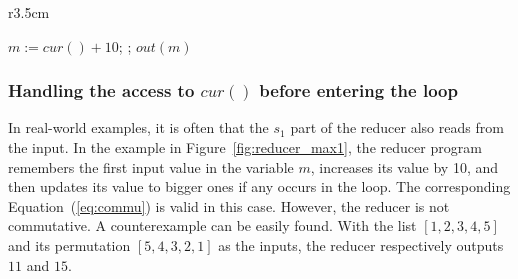 \documentclass{llncs}
\newcommand{\hide}[1]{}
\newcommand{\cur}{cur()}
\begin{document}
\begin{wrapfigure}{r}{3.5cm}
	\vspace{-1.5cm}
	\begin{algorithm}[H]
		\;\;$m := \cur + 10$; \;
		\Loop{}{
			$t:=\cur$\;
			\uIf{ $t> m$}{
				$m := t$ \;
			}
		};
		$out(m)$\;\;
	\end{algorithm}
	\vspace{-0.8cm}
	\caption{Reducer max$^+$}
	\vspace{-0.8cm}
	\label{fig:reducer_max1}
\end{wrapfigure}	


\hide{	
	\begin{figure}[t]
		\begin{minipage}{0.4\textwidth}
			\begin{algorithm}[H]
				\;\;$m := \cur + 10$; \;
				\Loop{}{
					$t:=\cur$\;
					\uIf{ $t> m$}{
						$m := t$ \;
					}
				};
				$out(m)$\;\;
			\end{algorithm}
			\caption*{(a) Reducer max$^+$}
		\end{minipage}
		\begin{minipage}{0.6\textwidth}
			\begin{algorithm}[H]
				$s:=*;$\;
				\Loop{}{
					\uIf{$s=1$}{$m := \cur + 10; s:= 2$}
					\uElse{
						$t:=\cur$\;
						\uIf{ $t > m$}{
							$m := t$ \;
						}
					}
				};
				$out(m)$
			\end{algorithm}
			\caption*{(b) Reducer max$^{+\mathtt{fix}}$}
		\end{minipage}
		\caption{Reducer examples}
		\label{fig:reducer_max}
	\end{figure}
}




\subsubsection{Handling the access to $\cur$ before entering the loop} In real-world examples, it is often that the $s_1$ part of the reducer also reads from the input. In the example in Figure~\ref{fig:reducer_max1}, the reducer program remembers the first input value in the variable $m$, increases its value by 10, and then updates its value to bigger ones if any occurs in the loop. The corresponding Equation~(\ref{eq:commu}) is valid in this case. However, the reducer is not commutative. A counterexample can be easily found. With the list $[1,2,3,4,5]$ and its permutation $[5,4,3,2,1]$ as the inputs, the reducer respectively outputs $11$ and $15$.
\end{document}
